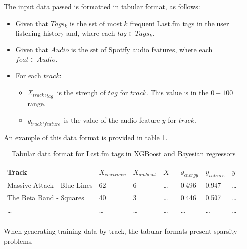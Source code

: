 \documentclass[sn-mathphys]{sn-jnl}%
\theoremstyle{thmstyleone}%
\theoremstyle{thmstyletwo}%
\theoremstyle{thmstylethree}%
\begin{document}
The input data passed is formatted in tabular format, as follows:

\begin{itemize}
      \item Given that $Tags_{k}$ is the set of most $k$ frequent Last.fm tags in the user listening history
            and, where each $tag \in Tags_{k}$.
      \item Given that $Audio$ is the set of Spotify audio features, where each $feat \in Audio$.
      \item For each $track$:
      \begin{itemize}
            \item $X_{track},_{tag}$ is the strengh of $tag$ for $track$. This value is in the $0-100$ range.
            \item $y_{track},_{feature}$ is the value of the audio feature $y$ for $track$.
      \end{itemize}
\end{itemize}

An example of this data format is provided in table \ref{tabular_tags_format}.

\begin{table}[h]
      \begin{center}
      \begin{minipage}{\textwidth}
      \caption{Tabular data format for Last.fm tags in XGBoost and Bayesian regressors}\label{tabular_tags_format}%
      \begin{tabular}{@{}lllllll@{}}
      \toprule
      Track                         & $X_{electronic}$ & $X_{ambient}$ & $X_{\dots}$ & $y_{energy}$ & $y_{valence}$ & $y_{\dots}$ \\
      \midrule
      Massive Attack - Blue Lines   & 62               & 6             &  \dots      & 0.496        & 0.947         & \dots  \\
      The Beta Band - Squares       & 40               & 3             &  \dots      & 0.446        & 0.507         & \dots  \\
      \dots                         & \dots            & \dots         &  \dots      & \dots        & \dots         & \dots  \\
      \botrule
      \end{tabular}
      \end{minipage}
      \end{center}
\end{table}

When generating training data by track, the tabular formats present sparsity problems.
\end{document}
